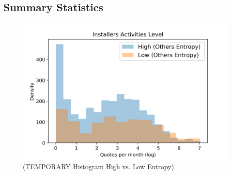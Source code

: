 \documentclass[msom,blindrev]{informs3}
\begin{document}
\subsection{Summary Statistics}
\begin{figure}
	\centering
	\includegraphics[width=0.7\linewidth]{histogram_by_high_low_ent.png}
	\caption{(TEMPORARY Histogram High vs. Low Entropy)}
	\label{histogram_by_ent_others}
\end{figure}
\end{document}
